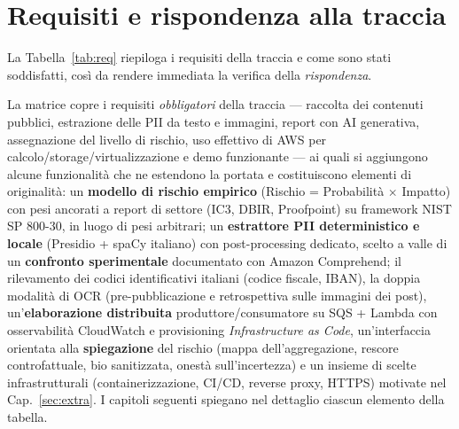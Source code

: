 \documentclass[11pt,a4paper]{article}
\begin{document}
\section{Requisiti e rispondenza alla traccia}
La Tabella~\ref{tab:req} riepiloga i requisiti della traccia e come sono stati
soddisfatti, così da rendere immediata la verifica della \emph{rispondenza}.


La matrice copre i requisiti \emph{obbligatori} della traccia --- raccolta dei contenuti
pubblici, estrazione delle PII da testo e immagini, report con AI generativa, assegnazione
del livello di rischio, uso effettivo di AWS per calcolo/storage/virtualizzazione e demo
funzionante --- ai quali si aggiungono alcune funzionalità che ne estendono la portata e
costituiscono elementi di originalità: un \textbf{modello di rischio empirico}
(Rischio = Probabilità $\times$ Impatto) con pesi ancorati a report di settore (IC3,
DBIR, Proofpoint) su framework NIST SP 800-30, in luogo di pesi arbitrari; un
\textbf{estrattore PII deterministico e locale} (Presidio + spaCy italiano) con
post-processing dedicato, scelto a valle di un \textbf{confronto sperimentale}
documentato con Amazon Comprehend; il rilevamento dei codici identificativi italiani
(codice fiscale, IBAN), la doppia modalità di OCR (pre-pubblicazione e retrospettiva sulle
immagini dei post), un'\textbf{elaborazione distribuita} produttore/consumatore su SQS +
Lambda con osservabilità CloudWatch e provisioning \emph{Infrastructure as Code}, un'interfaccia
orientata alla \textbf{spiegazione} del rischio (mappa dell'aggregazione, rescore
controfattuale, bio sanitizzata, onestà sull'incertezza) e un insieme di scelte infrastrutturali (containerizzazione, CI/CD,
reverse proxy, HTTPS) motivate nel Cap.~\ref{sec:extra}. I capitoli seguenti spiegano nel dettaglio
ciascun elemento della tabella.
\end{document}
